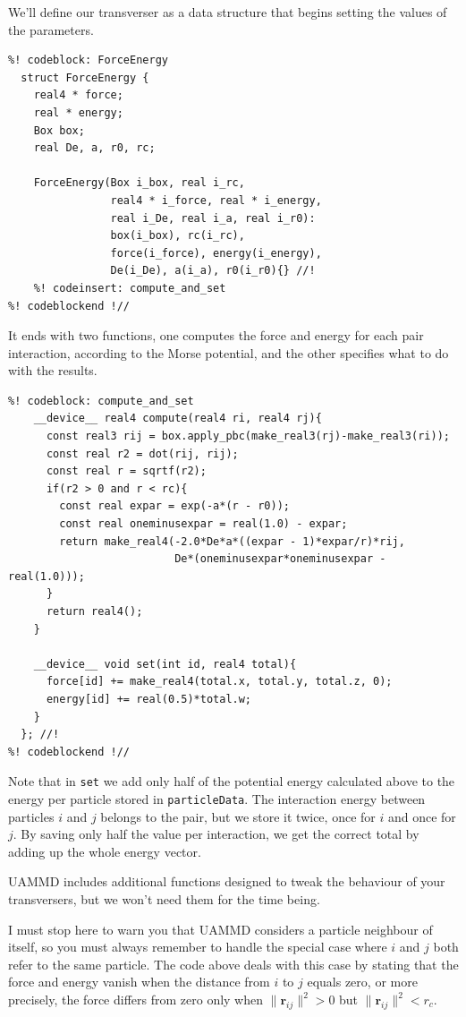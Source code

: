 We'll define our transverser as a data structure that begins setting the values
of the parameters.
\begin{lstlisting}
%! codeblock: ForceEnergy
  struct ForceEnergy {
    real4 * force;
    real * energy;
    Box box;
    real De, a, r0, rc;

    ForceEnergy(Box i_box, real i_rc,
                real4 * i_force, real * i_energy,
                real i_De, real i_a, real i_r0):
                box(i_box), rc(i_rc),
                force(i_force), energy(i_energy),
                De(i_De), a(i_a), r0(i_r0){} //!
    %! codeinsert: compute_and_set
%! codeblockend !//
\end{lstlisting}
It ends with two functions, one computes the force and energy for each pair 
interaction, according to the Morse potential, and the other specifies what to 
do with the results.
\begin{lstlisting}
%! codeblock: compute_and_set
    __device__ real4 compute(real4 ri, real4 rj){
      const real3 rij = box.apply_pbc(make_real3(rj)-make_real3(ri));
      const real r2 = dot(rij, rij);
      const real r = sqrtf(r2);
      if(r2 > 0 and r < rc){
        const real expar = exp(-a*(r - r0));
        const real oneminusexpar = real(1.0) - expar;
        return make_real4(-2.0*De*a*((expar - 1)*expar/r)*rij,
                          De*(oneminusexpar*oneminusexpar - real(1.0)));
      }
      return real4();
    }

    __device__ void set(int id, real4 total){
      force[id] += make_real4(total.x, total.y, total.z, 0);
      energy[id] += real(0.5)*total.w;
    }
  }; //!
%! codeblockend !//
\end{lstlisting}
Note that in \texttt{set} we add only half of the potential energy calculated 
above to the energy per particle stored in \texttt{particleData}. The 
interaction energy between particles $i$ and $j$ belongs to the pair, but
we store it twice, once for $i$ and once for $j$. By saving only half the value 
per interaction, we get the correct total by adding up the whole energy vector.

UAMMD includes additional functions designed to tweak the behaviour of your 
transversers, but we won't need them for the time being.

I must stop here to warn you that UAMMD considers a particle neighbour of 
itself, so you must always remember to handle the special case where $i$ and $j$ 
both refer to the same particle. The code above deals with this case by stating 
that the force and energy vanish when the distance from $i$ to $j$ equals zero, 
or more precisely, the force differs from zero only when $\|\mathbf{r}_{ij}\|^2 
> 0$ but $\|\mathbf{r}_{ij}\|^2 < r_c$.

